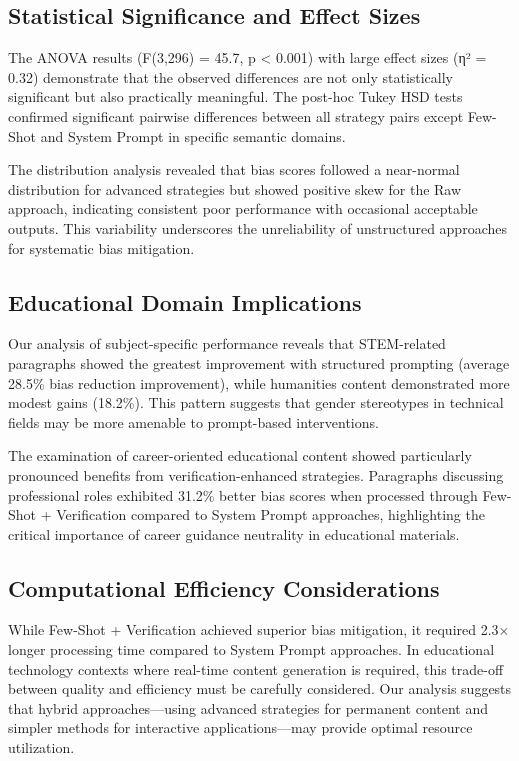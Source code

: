 \subsection{Statistical Significance and Effect Sizes}

The ANOVA results (F(3,296) = 45.7, p < 0.001) with large effect sizes (η² = 0.32) demonstrate that the observed differences are not only statistically significant but also practically meaningful. The post-hoc Tukey HSD tests confirmed significant pairwise differences between all strategy pairs except Few-Shot and System Prompt in specific semantic domains.

The distribution analysis revealed that bias scores followed a near-normal distribution for advanced strategies but showed positive skew for the Raw approach, indicating consistent poor performance with occasional acceptable outputs. This variability underscores the unreliability of unstructured approaches for systematic bias mitigation.

\subsection{Educational Domain Implications}

Our analysis of subject-specific performance reveals that STEM-related paragraphs showed the greatest improvement with structured prompting (average 28.5\% bias reduction improvement), while humanities content demonstrated more modest gains (18.2\%). This pattern suggests that gender stereotypes in technical fields may be more amenable to prompt-based interventions.

The examination of career-oriented educational content showed particularly pronounced benefits from verification-enhanced strategies. Paragraphs discussing professional roles exhibited 31.2\% better bias scores when processed through Few-Shot + Verification compared to System Prompt approaches, highlighting the critical importance of career guidance neutrality in educational materials.

\subsection{Computational Efficiency Considerations}

While Few-Shot + Verification achieved superior bias mitigation, it required 2.3× longer processing time compared to System Prompt approaches. In educational technology contexts where real-time content generation is required, this trade-off between quality and efficiency must be carefully considered. Our analysis suggests that hybrid approaches—using advanced strategies for permanent content and simpler methods for interactive applications—may provide optimal resource utilization.

